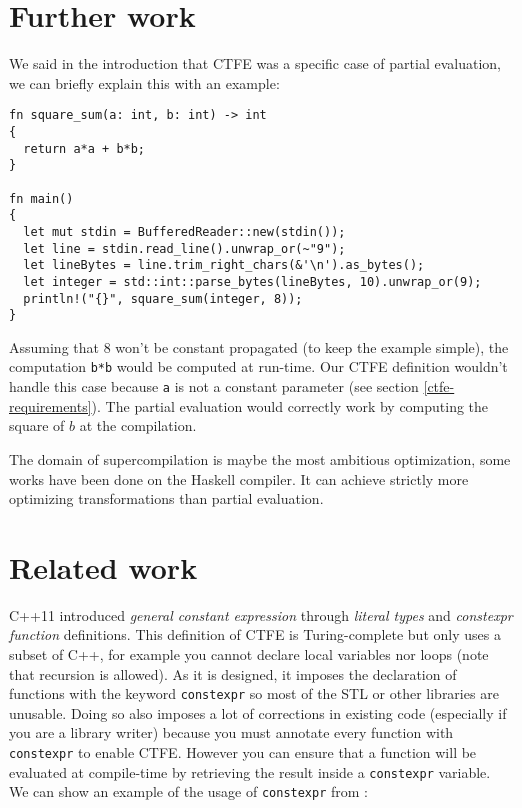 \documentclass[a4paper,11pt]{article}
\begin{document}
\section{Further work}
\label{further-work}

We said in the introduction that CTFE was a specific case of partial evaluation\cite{PE}, we can briefly explain this with an example:

\begin{lstlisting}
fn square_sum(a: int, b: int) -> int
{
  return a*a + b*b;
}

fn main()
{
  let mut stdin = BufferedReader::new(stdin());
  let line = stdin.read_line().unwrap_or(~"9");
  let lineBytes = line.trim_right_chars(&'\n').as_bytes();
  let integer = std::int::parse_bytes(lineBytes, 10).unwrap_or(9);
  println!("{}", square_sum(integer, 8));
}
\end{lstlisting}

Assuming that $8$ won't be constant propagated (to keep the example simple), the computation \lstinline{b*b} would be computed at run-time. Our CTFE definition wouldn't handle this case because \lstinline{a} is not a constant parameter (see section \ref{ctfe-requirements}). The partial evaluation would correctly work by computing the square of $b$ at the compilation.
\newline

The domain of supercompilation is maybe the most ambitious optimization, some works have been done on the Haskell compiler\cite{Bolingbroke:2010:SE:2088456.1863540}. It can achieve strictly more optimizing transformations than partial evaluation\cite{Sorensen94towardsunifying}.

\section{Related work}
\label{related-work}

C++11 introduced \textit{general constant expression} \cite{DosReis:2010:GCE:1774088.1774537} through \textit{literal types} and \textit{constexpr function} definitions. This definition of CTFE is Turing-complete but only uses a subset of C++, for example you cannot declare local variables nor loops (note that recursion is allowed). As it is designed, it imposes the declaration of functions with the keyword \lstinline{constexpr} so most of the STL or other libraries are unusable. Doing so also imposes a lot of corrections in existing code (especially if you are a library writer) because you must annotate every function with \lstinline{constexpr} to enable CTFE. However you can ensure that a function will be evaluated at compile-time by retrieving the result inside a \lstinline{constexpr} variable. We can show an example of the usage of \lstinline{constexpr} from \cite{DosReis:2010:GCE:1774088.1774537}:
\end{document}
